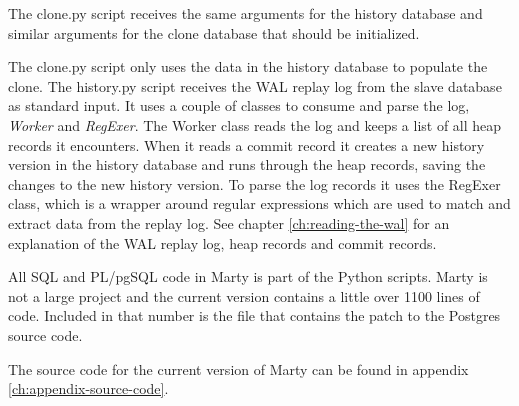 The clone.py script receives the same arguments for the history database and similar arguments for the clone database that should be initialized.

The clone.py script only uses the data in the history database to populate the clone.
The history.py script receives the WAL replay log from the slave database as standard input.
It uses a couple of classes to consume and parse the log, \textit{Worker} and \textit{RegExer}.
The Worker class reads the log and keeps a list of all heap records it encounters.
When it reads a commit record it creates a new history version in the history database and runs through the heap records, saving the changes to the new history version.
To parse the log records it uses the RegExer class, which is a wrapper around regular expressions which are used to match and extract data from the replay log.
See chapter \ref{ch:reading-the-wal} for an explanation of the WAL replay log, heap records and commit records.

All SQL and PL/pgSQL code in Marty is part of the Python scripts.
Marty is not a large project and the current version contains a little over 1100 lines of code.
Included in that number is the file that contains the patch to the Postgres source code.

The source code for the current version of Marty can be found in appendix \ref{ch:appendix-source-code}.